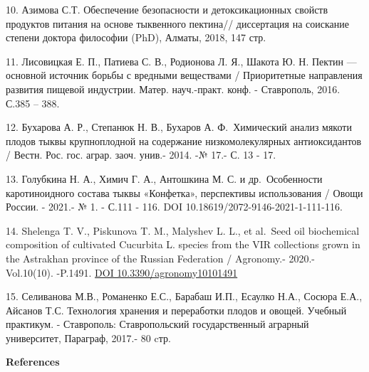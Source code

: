 \begin{references}
10. Азимова С.Т. Обеспечение безопасности и детоксикационных свойств
продуктов питания на основе тыквенного пектина// диссертация на
соискание степени доктора философии (PhD), Алматы, 2018, 147 стр.

11. Лисовицкая Е. П., Патиева С. В., Родионова Л. Я., Шакота Ю.
Н. Пектин --- основной источник борьбы с вредными веществами /
Приоритетные направления развития пищевой индустрии. Матер. науч.-практ.
конф. - Ставрополь, 2016. С.385 -- 388.

12. Бухарова А. Р., Степанюк Н. В., Бухаров А. Ф.~Химический анализ
мякоти плодов тыквы крупноплодной на содержание низкомолекулярных
антиоксидантов / Вестн. Рос. гос. аграр. заоч. унив.- 2014. -№ 17.- С.
13 - 17.

13. Голубкина Н. А., Химич Г. А., Антошкина М. С. и др.~Особенности
каротиноидного состава тыквы «Конфетка», перспективы использования /
Овощи России. - 2021.- № 1. - С.111 - 116. DOI
10.18619/2072-9146-2021-1-111-116.

14. Shelenga T. V., Piskunova T. M., Malyshev L. L., et al.~Seed oil
biochemical composition of cultivated Cucurbita L. species from the VIR
collections grown in the Astrakhan province of the Russian Federation /
Agronomy.- 2020.- Vol.10(10). -P.1491.
\href{https://doi.org/10.3390/agronomy10101491}{DOI 10.3390/agronomy10101491}

15. Селиванова М.В., Романенко Е.С., Барабаш И.П., Есаулко Н.А., Сосюра
Е.А., Айсанов Т.С. Технология хранения и переработки плодов и овощей.
Учебный практикум. - Ставрополь: Ставропольский государственный аграрный
университет, Параграф, 2017.- 80 cтр.
\end{references}

\begin{center}
{\bfseries References}
\end{center}

